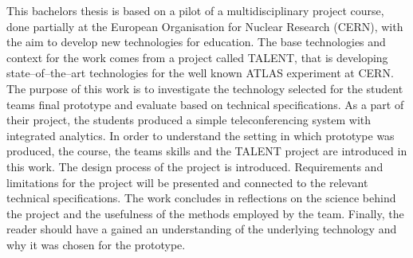 \documentclass[english,12pt,a4paper,pdftex]{article}
\begin{document}

\makecoverpage

\begin{abstractpage}[english]

This bachelors thesis is based on a pilot of a multidisciplinary project course, done partially at the European Organisation for Nuclear Research (CERN), with the aim to develop new technologies for education. The base technologies and context for the work comes from a project called TALENT, that is developing state--of--the--art technologies for the well known ATLAS experiment at CERN. The purpose of this work is to investigate the technology selected for the student teams final prototype and evaluate based on technical specifications. As a part of their project, the students produced a simple teleconferencing system with integrated analytics. In order to understand the setting in which prototype was produced, the course, the teams skills and the TALENT project are introduced in this work. The design process of the project is introduced. Requirements and limitations for the project will be presented and connected to the relevant technical specifications. The work concludes in reflections on the science behind the project and the usefulness of the methods employed by the team. Finally, the reader should have a gained an understanding of the underlying technology and why it was chosen for the prototype.


\end{abstractpage}
\end{document}
